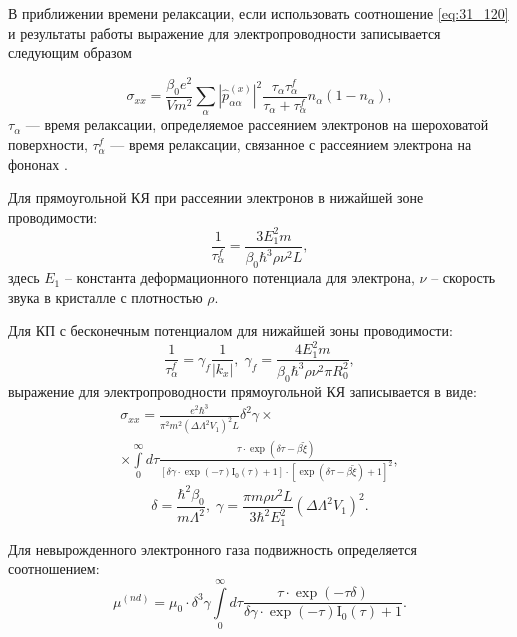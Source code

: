 В приближении времени релаксации, если использовать соотношение \eqref{eq:31_120} и результаты работы \cite{Khamidullin2002} выражение для электропроводности записывается следующим образом

\begin{equation} \label{eq:31_320}
\sigma _{xx} =\frac{\beta_0 e^2 }{Vm^2 } \sum _{\alpha }\left|\hat{p}_{\alpha \alpha }^{(x)} \right|^{2} \frac{\tau _{\alpha } \tau_{\alpha }^f }{\tau_{\alpha } +\tau_{\alpha }^f } n_{\alpha } \left(1-n_{\alpha } \right),
\end{equation}
$\tau _{\alpha } $ --- время релаксации, определяемое рассеянием электронов на шероховатой поверхности, $\tau_{\alpha }^f $ --- время релаксации, связанное с рассеянием электрона на фононах \cite{Khamidullin2002}.

Для прямоугольной КЯ при рассеянии электронов в нижайшей зоне проводимости:
\begin{equation} \label{eq:31_330}
\frac{1}{\tau_{\alpha }^f } = \frac{3 E_1^2 m}{\beta_0 \hbar^3 \rho \nu^2 L},
\end{equation}
здесь $E_1 $ -- константа деформационного потенциала для электрона, $\nu $ -- скорость звука в кристалле с плотностью $\rho $.

Для КП с бесконечным потенциалом для нижайшей зоны проводимости:
\begin{equation} \label{eq:31_340}
\frac{1}{\tau _{\alpha }^f } =\gamma_f \frac{1}{\left|k_{x} \right|}, \;
\gamma_f =\frac{4 E_1^2 m}{\beta_0 \hbar^3 \rho \nu^2 \pi R_0^2 },
\end{equation}
выражение для электропроводности прямоугольной КЯ записывается в виде:
\begin{multline} \label{eq:31_350}
\sigma _{xx} =\frac{e^2 \hbar^3 }{\pi^2 m^2 \left(\Delta \Lambda^2 V_1 \right)^2 L} \delta^2 \gamma \times \\
 \times \int\limits_0^{\infty }{d\tau \frac{\tau \cdot \exp (\delta \tau -\beta \tilde{\xi })}{\left[\delta \gamma \cdot \exp(-\tau ) \mathrm{I}_0 (\tau )+1\right]\cdot \left[\exp(\delta \tau -\beta \tilde{\xi })+1\right]^{2} }},
\end{multline}
\[
\delta =\frac{\hbar^2 \beta_0 }{m \Lambda^2 }, \;
\gamma =\frac{\pi m\rho \nu^2 L}{3\hbar^2 E_1^2 } \left(\Delta \Lambda^2 V_1 \right)^2 .
\]
 
Для невырожденного электронного газа подвижность определяется соотношением:
\begin{equation} \label{eq:31_360}
\mu ^{(nd)} =\mu_0 \cdot \delta^3 \gamma \int\limits_0^{\infty}{d\tau \frac{\tau \cdot \exp(-\tau \delta )}{\delta \gamma \cdot \exp(-\tau ) \mathrm{I}_0 (\tau )+1}}. 
\end{equation}

